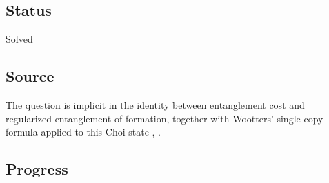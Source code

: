 \subsection*{Status}

Solved

\subsection*{Source}

The question is implicit in the identity between entanglement cost and
regularized entanglement of formation, together with Wootters' single-copy
formula applied to this Choi state
,
.

\subsection*{Progress}

